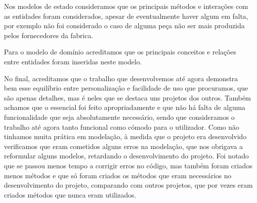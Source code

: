 \documentclass[10pt, a4paper]{article}
\begin{document}
Nos modelos de estado consideramos que os principais métodos e interações com as entidades foram considerados, apesar de eventualmente haver algum em falta, por exemplo não foi considerado o caso de alguma peça não ser mais produzida pelos fornecedores da fabrica.

Para o modelo de domínio acreditamos que os principais conceitos e relações entre entidades foram inseridas neste modelo.

No final, acreditamos que o trabalho que desenvolvemos até agora demonstra bem esse equilíbrio entre personalização e facilidade de uso que procuramos, que são apenas detalhes, mas é neles que se destaca uns projetos dos outros. Também achamos que o essencial foi feito apropriadamente e que não há falta de alguma funcionalidade que seja absolutamente necessário, sendo que consideramos o trabalho até agora tanto funcional como cómodo para o utilizador. Como não tinhamos muita prática em modelação, à medida que o projeto era desenvolvido verificamos que eram cometidos alguns erros na modelação, que nos obrigava a reformular alguns modelos, retardando o desenvolvimento do projeto. Foi notado que se passou menos tempo a corrigir erros no código, mas também foram criados menos métodos e que só foram criados os métodos que eram necessários no desenvolvimento do projeto, comparando com outros projetos, que por vezes eram criados métodos que nunca eram utilizados.
\end{document}
